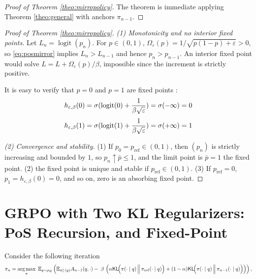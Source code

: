 \documentclass[11pt,reqno]{amsart}
\def\argmax{\operatornamewithlimits{arg\,max}}
\DeclareMathOperator{\logit}{logit}
\begin{document}
\begin{proof}[Proof of Theorem \ref{theo:mirropolicy}] The theorem is immediate applying Theorem \ref{theo:general} with anchors $\pi_{n-1}$.

\end{proof}


\begin{proof}[Proof of Theorem \ref{theo:mirropolicy}]
\emph{(1) Monotonicity and no interior fixed points.} Let $L_{n} = \logit(p_{n})$.
For $p\in(0,1)$, $\Omega_\varepsilon(p)=1/\sqrt{p(1-p)+\varepsilon}>0$, so \eqref{eq:posmirror} implies $L_n>L_{n-1}$ and hence $p_n>p_{n-1}$. An interior fixed point would solve $L=L+\Omega_\varepsilon(p)/\beta$, impossible since the increment is strictly positive.

It is easy to verify that $p =0$ and $p=1$ are fixed points :
\[h_{\varepsilon,\beta}(0) = \sigmoid ( \logit(0) + \frac{1}{\beta \sqrt{\varepsilon}} ) = \sigmoid(-\infty)=0\]
\[ h_{\varepsilon,\beta}(1) = \sigmoid ( \logit(1) + \frac{1}{\beta \sqrt{\varepsilon}} ) = \sigmoid(+\infty)=1 \]




\emph{(2) Convergence and stability.}
(1) If $p_0= p_{\mathrm{ref}}\in(0,1)$, then  $(p_n)$ is strictly increasing and bounded by $1$, so $p_n\uparrow \bar p\le 1$,  and the limit point is $\bar{p}=1$ the fixed point. 
(2) the fixed point is unique and stable if $p_{\mathrm{ref}} \in(0,1)$.
(3) If $p_{\mathrm{ref}}=0$, $p_1=h_{\varepsilon,\beta}(0) = 0 $, and so on, zero is an absorbing fixed point.


\end{proof}








\section{GRPO with Two KL Regularizers: PoS Recursion, and Fixed-Point }
\label{sec:two-kl}

Consider the following iteration 
\begin{equation}
\label{eq:mirror-obj2KL}
\pi_{n}=\argmax_{\pi}\; \mathbb{E}_{q\sim \rho_{\mathcal{Q}}} \left(\mathbb{E}_{\pi(\cdot|q)}
 A_{n-1}(q,\cdot)-\;\beta\, \left( \alpha \mathsf{KL}\!\Big(\pi(\cdot\mid q)\,\Big\|\,\pi_{\mathrm{ref}}(\cdot\mid q)\Big)+ (1-\alpha ) \mathsf{KL}\!\Big(\pi(\cdot\mid q)\,\Big\|\,\pi_{n-1}(\cdot\mid q)\Big)\right) \right),
\end{equation}
\end{document}
